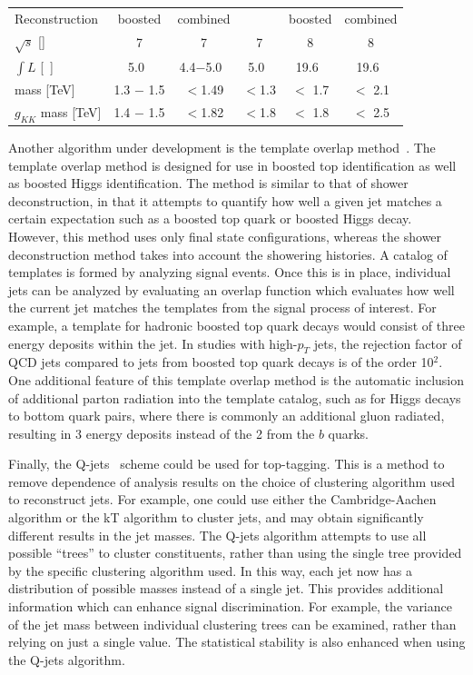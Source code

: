 \begin{table}[htpb!]
\begin{center}
\begin{tabular}{lccccc}
Reconstruction                   & boosted         & combined &          & boosted & combined  \\ 
$\sqrt{s}$ [\tev{}] & 7 &  7 & 7  & 8 & 8 \\
$\int{L} $ [~\ifb{}] & 5.0~\ifb{} & 4.4$-$5.0~\ifb{} &   5.0~\ifb{} &  19.6~\ifb{}  &  19.6~\ifb{}  \\
\Zprime{} mass [TeV]  & 1.3 $-$ 1.5 & $ < $1.49 & $ < $1.3  & $ < $ 1.7 &   $ < $  2.1   \\
$g_{KK} $ mass [TeV]  &  1.4 $-$ 1.5  & $ < $1.82 & $ < $1.8  & $ < $ 1.8 & $ < $ 2.5   \\ \hline 
\end{tabular}
\label{tab:limits}
\end{center}
\end{table} 

Another algorithm under development is the template 
overlap method~\cite{Backovic:2012jj}. The template overlap method 
is designed for use in boosted top identification as well as boosted Higgs 
identification.  The method is similar to that of shower deconstruction, 
in that it attempts to quantify how well a given jet matches a certain 
expectation such as a boosted top quark or boosted Higgs decay. However, 
this method uses only final state configurations, whereas the shower 
deconstruction method takes into account the showering histories. A catalog 
of templates is formed by analyzing signal events. Once this is in place, 
individual jets can be analyzed by evaluating an overlap function which 
evaluates how well the current jet matches the templates from the signal 
process of interest.  For example, a template for hadronic boosted top 
quark decays would consist of three energy deposits within the jet. In 
studies with high-$p_T$ jets, the rejection factor of QCD jets compared 
to jets from boosted top quark decays is of the order 10$^2$. One additional 
feature of this template overlap method is the automatic inclusion of 
additional parton radiation into the template catalog, such as for Higgs 
decays to bottom quark pairs, where there is commonly an additional gluon 
radiated, resulting in 3 energy deposits instead of the 2 from the $b$ quarks.

Finally, the Q-jets~\cite{Ellis:2012sn} scheme could be used for top-tagging.
This is a method to remove dependence of analysis results on the choice of 
clustering algorithm used to reconstruct jets.  For example, one could use 
either the Cambridge-Aachen algorithm or the kT algorithm to cluster jets, 
and may obtain significantly different results in the jet masses.  The 
Q-jets algorithm attempts to use all possible ``trees'' to cluster 
constituents, rather than using the single tree provided by the specific 
clustering algorithm used.  In this way, each jet now has a distribution 
of possible masses instead of a single jet. This provides additional 
information which can enhance signal discrimination. For example, the 
variance of the jet mass between individual clustering trees can be examined, 
rather than relying on just a single value. The statistical stability is 
also enhanced when using the Q-jets algorithm.

